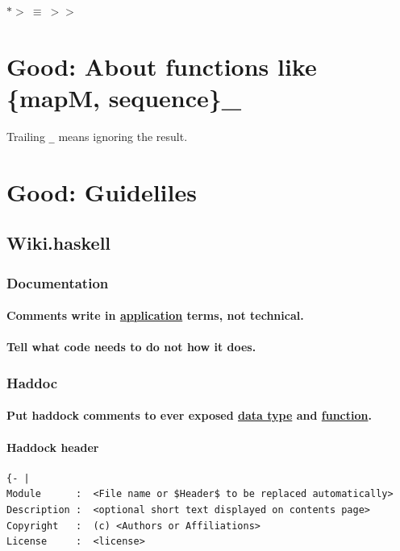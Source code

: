 \documentclass[a4paper,14pt,oneside]{book}
\begin{document}
{\(*> \ \equiv \ >>\)\\

\chapter{\label{org4a552ff}Good: About functions like \{mapM, sequence\}\_}
\label{sec:orgd824745}
Trailing \texttt{\_} means ignoring the result.\\

\chapter{\label{org2ff60b9}Good: Guideliles}
\label{sec:org07265ac}
\section{Wiki.haskell}
\label{sec:org9d05a1c}

\subsection{Documentation}
\label{sec:orge11872b}

\subsubsection{Comments write in \hyperref[org623a42d]{application} terms, not technical.}
\label{sec:org2f2d85c}

\subsubsection{Tell what code needs to do not how it does.}
\label{sec:org709e7ea}

\subsection{Haddoc}
\label{sec:org67158e2}

\subsubsection{Put haddock comments to ever exposed \hyperref[org3de168a]{data type} and \hyperref[org6a60524]{function}.}
\label{sec:org5f15295}

\subsubsection{Haddock header}
\label{sec:org15119ab}
\begin{verbatim}
{- |
Module      :  <File name or $Header$ to be replaced automatically>
Description :  <optional short text displayed on contents page>
Copyright   :  (c) <Authors or Affiliations>
License     :  <license>


\end{verbatim}}
\end{document}
